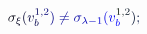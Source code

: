 \documentclass[12pt]{article}
\begin{document}
\makeatletter
\renewcommand*{\@textcolor}[3]{%
  \protect\leavevmode
  \begingroup
    \color#1{#2}#3%
  \endgroup
}
\makeatother
\begin{displaymath}
\mathcolor[RGB]{0,0,15}{\sigma} _ { \mathcolor[RGB]{0,0,30}{\xi} } \mathcolor[RGB]{0,0,45}{(} \mathcolor[RGB]{0,0,60}{v} _ { \mathcolor[RGB]{0,0,75}{b} } ^ { \mathcolor[RGB]{0,0,90}{1} \mathcolor[RGB]{0,0,105}{,} \mathcolor[RGB]{0,0,120}{2} } \mathcolor[RGB]{0,0,135}{)} \mathcolor[RGB]{0,0,150}{\neq} \mathcolor[RGB]{0,0,165}{\sigma} _ { \mathcolor[RGB]{0,0,180}{\lambda} \mathcolor[RGB]{0,0,195}{-} \mathcolor[RGB]{0,0,210}{1} } \mathcolor[RGB]{0,0,225}{(} \mathcolor[RGB]{0,0,240}{v} _ { \mathcolor[RGB]{0,0,255}{b} } ^ { \mathcolor[RGB]{0,15,0}{1} \mathcolor[RGB]{0,15,15}{,} \mathcolor[RGB]{0,15,30}{2} } \mathcolor[RGB]{0,15,45}{)} \mathcolor[RGB]{0,15,60}{;}
\end{displaymath}
\end{document}
